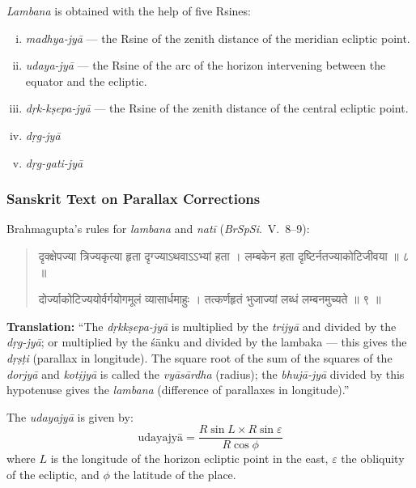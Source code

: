 \documentclass[11pt,a4paper]{article}
\newcommand{\dev}[1]{{\devanagarifont #1}}
\newenvironment{sanskritverse}{%
  \begin{quote}
  \devanagarifont
  \small
  \color{titlecolor}
}{\end{quote}}
\theoremstyle{definition}
\begin{document}
\textit{Lambana} is obtained with the help of five Rsines:
\begin{enumerate}[(i)]
  \item \textit{madhya-jy\=a} --- the Rsine of the zenith distance of the meridian ecliptic point.
  \item \textit{udaya-jy\=a} --- the Rsine of the arc of the horizon intervening between the equator and the ecliptic.
  \item \textit{d\d{r}k-k\d{s}epa-jy\=a} --- the Rsine of the zenith distance of the central ecliptic point.
  \item \textit{d\d{r}g-jy\=a}
  \item \textit{d\d{r}g-gati-jy\=a}
\end{enumerate}



\subsubsection{Sanskrit Text on Parallax Corrections}

Brahmagupta's rules for \textit{lambana} and \textit{nat\=i} (\textit{BrSpSi}.\ V.\ 8--9):

\begin{sanskritverse}
\dev{दृक्क्षेपज्या त्रिज्यकृत्या हृता दृग्ज्याऽथवाऽऽभ्यां हता ।}
\dev{लम्बकेन हता दृष्टिर्नतज्याकोटिजीवया ॥ ८ ॥}

\dev{दोर्ज्याकोटिज्ययोर्वर्गयोगमूलं व्यासार्धमाहुः ।}
\dev{तत्कर्णहृतं भुजाज्यां लब्धं लम्बनमुच्यते ॥ ९ ॥}
\end{sanskritverse}

\textbf{Translation:} ``The \textit{d\d{r}kk\d{s}epa-jy\=a} is multiplied by the \textit{trijy\=a} and divided by the \textit{d\d{r}g-jy\=a}; or multiplied by the \'s\=anku and divided by the lambaka --- this gives the \textit{d\d{r}\d{s}\d{t}i} (parallax in longitude). The square root of the sum of the squares of the \textit{dorjy\=a} and \textit{kot\d{i}jy\=a} is called the \textit{vy\=as\=ardha} (radius); the \textit{bhuj\=a-jy\=a} divided by this hypotenuse gives the \textit{lambana} (difference of parallaxes in longitude).''

\vspace{0.3cm}
The \textit{udayajy\=a} is given by:
\[
\text{udayajy\=a} = \frac{R \sin L \times R \sin \varepsilon}{R \cos \phi}
\]
where $L$ is the longitude of the horizon ecliptic point in the east, $\varepsilon$ the obliquity of the ecliptic, and $\phi$ the latitude of the place.
\end{document}
